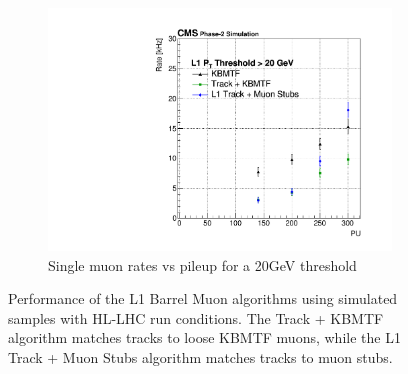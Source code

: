 \begin{figure} [htb!]
\begin{subfigure}[h]{0.45\linewidth}
		\includegraphics[width=\linewidth]{figs/04_muons/rateVsPU_TPS.pdf}
		\caption{Single muon rates vs pileup for a 20\unit{GeV} threshold~\cite{CERN-LHCC-2020-004}}
		\label{}
	\end{subfigure}
	\caption[Performance of the L1 Barrel Muon algorithms using simulated samples with HL-LHC run conditions. The Track + KBMTF algorithm matches tracks to loose KBMTF muons, while the L1 Track + Muon Stubs algorithm matches tracks to muon stubs.]{Performance of the L1 Barrel Muon algorithms using simulated samples with HL-LHC run conditions. The Track + KBMTF algorithm matches tracks to loose KBMTF muons, while the L1 Track + Muon Stubs algorithm matches tracks to muon stubs.}
	\label{fig:rate_eff_HLLHC}
\end{figure}